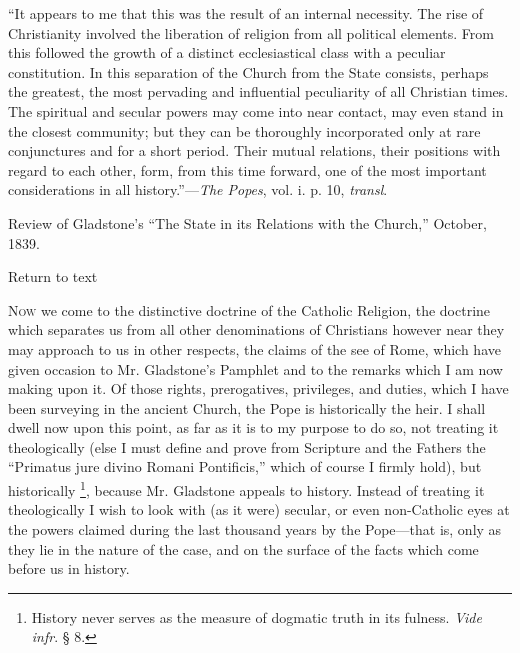 ``It appears to me that this was the result of an internal
necessity. The rise of Christianity involved the liberation of religion
from all political elements. From this followed the growth of a distinct
ecclesiastical class with a peculiar constitution. In this separation of
the Church from the State consists, perhaps the greatest, the most
pervading and influential peculiarity of all Christian times. The
spiritual and secular powers may come into near contact, may even stand
in the closest community; but they can be thoroughly incorporated only
at rare conjunctures and for a short period. Their mutual relations,
their positions with regard to each other, form, from this time forward,
one of the most important considerations in all history.''—\emph{The
Popes}, vol. i. p. 10, \emph{transl}.


Review of Gladstone's ``The State in its Relations with the
Church,'' October, 1839.

Return to text


N\textsc{ow} we come to the distinctive doctrine of the Catholic
Religion, the doctrine which separates us from all other denominations
of Christians however near they may approach to us in other respects,
the claims of the see of Rome, which have given occasion to Mr.
Gladstone's Pamphlet and to the remarks which I am now making upon it.
Of those rights, prerogatives, privileges, and duties, which I have been
surveying in the ancient Church, the Pope is historically the heir. I
shall dwell now upon this point, as far as it is to my purpose to do so,
not treating it theologically (else I must define and prove from
Scripture and the Fathers the ``Primatus jure divino Romani
Pontificis,'' which of course I firmly hold), but historically \footnote{History never serves as the measure of dogmatic truth in its
fulness. \emph{Vide infr}. § 8.}, because Mr. Gladstone appeals to history. Instead of treating it
theologically I wish to look with (as it were) secular, or even
non-Catholic eyes at the powers claimed during the last thousand years
by the Pope—that is, only as they lie in the nature of the case, and
on the surface of the facts which come before us in history.

